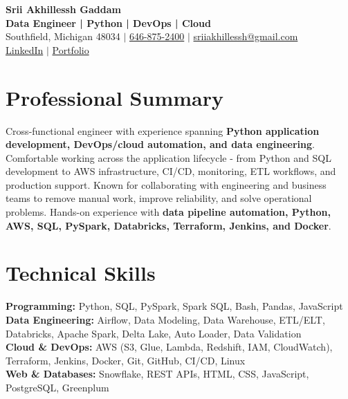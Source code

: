\documentclass[letterpaper,10pt]{article}
\begin{document}
\fontsize{9.35pt}{10.45pt}\selectfont

\begin{center}
    {\LARGE \textbf{Srii Akhillessh Gaddam}} \\[-1pt]
    \textbf{Data Engineer | Python | DevOps | Cloud} \\[2pt]
    Southfield, Michigan 48034 $|$
    \href{tel:6468752400}{646-875-2400} $|$
    \href{mailto:sriiakhillessh@gmail.com}{sriiakhillessh@gmail.com} \\[1pt]
    \href{https://www.linkedin.com/in/srii-akhiilessh-gaddam-b48668191/}{LinkedIn} $|$
    \href{https://sriiakhillesshg.github.io/portfolio/}{Portfolio}
\end{center}
\vspace{-8pt}

\section{Professional Summary}
\small{Cross-functional engineer with experience spanning \textbf{Python application development, DevOps/cloud automation, and data engineering}. Comfortable working across the application lifecycle - from Python and SQL development to AWS infrastructure, CI/CD, monitoring, ETL workflows, and production support. Known for collaborating with engineering and business teams to remove manual work, improve reliability, and solve operational problems. Hands-on experience with \textbf{data pipeline automation, Python, AWS, SQL, PySpark, Databricks, Terraform, Jenkins, and Docker}.}

\section{Technical Skills}
\small{
\textbf{Programming:} Python, SQL, PySpark, Spark SQL, Bash, Pandas, JavaScript \\
\textbf{Data Engineering:} Airflow, Data Modeling, Data Warehouse, ETL/ELT, Databricks, Apache Spark, Delta Lake, Auto Loader, Data Validation \\
\textbf{Cloud \& DevOps:} AWS (S3, Glue, Lambda, Redshift, IAM, CloudWatch), Terraform, Jenkins, Docker, Git, GitHub, CI/CD, Linux \\
\textbf{Web \& Databases:} Snowflake, REST APIs, HTML, CSS, JavaScript, PostgreSQL, Greenplum
}
\end{document}
